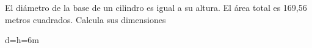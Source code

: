 \documentclass[addpoints,spanish, 12pt,a4paper]{exam}
\begin{document}
\begin{questions}
%





        




\question[2] El  diámetro  de  la  base  de  un  cilindro  es  igual  a  su  altura.  El  área  total  es  169,56 metros cuadrados. Calcula sus dimensiones
\begin{solution}
d=h=6m
\end{solution}



\end{questions}
\end{document}
